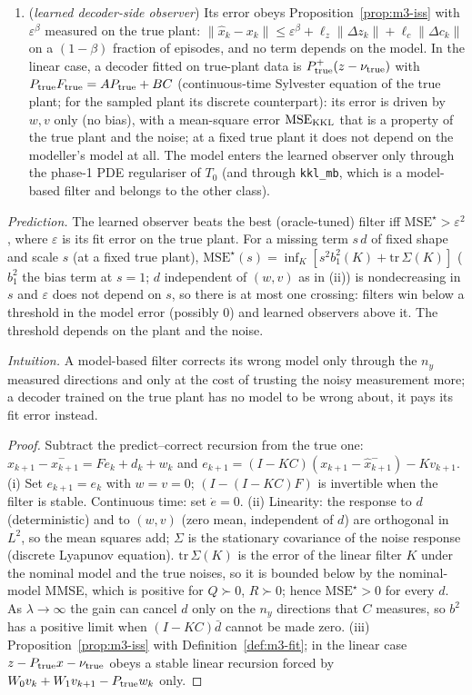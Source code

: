 \begin{proposition}
\begin{enumerate}[label=(\roman*)]
\item (\emph{learned decoder-side observer}) Its error obeys Proposition~\ref{prop:m3-iss} with $\varepsilon^\beta$
measured on the true plant: $\|\hat x_k-x_k\|\le\varepsilon^\beta+\ell_z\|\Delta z_k\|+\ell_c\|\Delta c_k\|$ on a
$(1-\beta)$ fraction of episodes, and no term depends on the model. In the linear case, a decoder fitted on true-plant
data is $P_{\rm true}^{+}(z-\nu_{\rm true})$ with $P_{\rm true}F_{\rm true}=AP_{\rm true}+BC$ (continuous-time Sylvester
equation of the true plant; for the sampled plant its discrete counterpart): its error is driven by $w,v$ only (no bias),
with a mean-square error $\mathrm{MSE}_{\rm KKL}$ that is a property of the true plant and the noise; at a fixed true
plant it does not depend on the modeller's model at all. The model enters the
learned observer only through the phase-1 PDE regulariser of $T_0$ (and through \texttt{kkl\_mb}, which is a model-based
filter and belongs to the other class).
\end{enumerate}
\emph{Prediction.} The learned observer beats the best (oracle-tuned) filter iff $\mathrm{MSE}^\star>\varepsilon^2$,
where $\varepsilon$ is its fit error on the true plant. For a missing term $s\,d$ of fixed shape and scale $s$ (at a fixed
true plant), $\mathrm{MSE}^\star(s)=\inf_K[s^2b_1^2(K)+\mathrm{tr}\,\Sigma(K)]$ ($b_1^2$ the bias term at $s=1$; $d$ independent of $(w,v)$ as in (ii)) is nondecreasing in $s$ and $\varepsilon$ does
not depend on $s$, so there is at most one crossing: filters win below a threshold in the model error (possibly $0$) and
learned observers above it. The threshold depends on the plant and the noise.
\end{proposition}
\emph{Intuition.} A model-based filter corrects its wrong model only through the $n_y$ measured directions and only
at the cost of trusting the noisy measurement more; a decoder trained on the true plant has no model to be wrong about,
it pays its fit error instead.
\begin{proof}
Subtract the predict--correct recursion from the true one: $x_{k+1}-\hat x^-_{k+1}=Fe_k+d_k+w_k$ and
$e_{k+1}=(I-KC)(x_{k+1}-\hat x^-_{k+1})-Kv_{k+1}$. (i) Set $e_{k+1}=e_k$ with $w=v=0$; $(I-(I-KC)F)$ is invertible when
the filter is stable. Continuous time: set $\dot e=0$. (ii) Linearity: the response to $d$ (deterministic) and to
$(w,v)$ (zero mean, independent of $d$) are orthogonal in $L^2$, so the mean squares add; $\Sigma$ is the stationary
covariance of the noise response (discrete Lyapunov equation). $\mathrm{tr}\,\Sigma(K)$ is the error of the linear filter
$K$ under the nominal model and the true noises, so it is bounded below by the nominal-model MMSE, which is positive for
$Q\succ0$, $R\succ0$; hence $\mathrm{MSE}^\star>0$ for every $d$. As $\lambda\to\infty$ the gain can cancel $d$ only on the $n_y$
directions that $C$ measures, so $b^2$ has a positive limit when $(I-KC)\bar d$ cannot be made zero. (iii)
Proposition~\ref{prop:m3-iss} with
Definition~\ref{def:m3-fit}; in the linear case $z-P_{\rm true}x-\nu_{\rm true}$ obeys a stable linear recursion forced
by $W_0v_k+W_1v_{k+1}-P_{\rm true}w_k$ only.
\end{proof}
